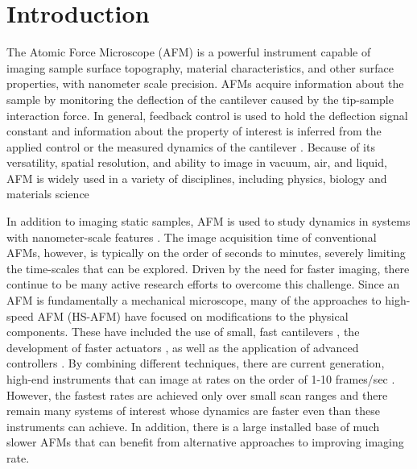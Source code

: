 \documentclass[twocolumn,oneside]{IEEEtran/IEEEtran}
\begin{document}
\section{Introduction}\label{sec:introduction}






The Atomic Force Microscope (AFM) is a powerful instrument capable of
imaging sample surface topography, material characteristics, and other
surface properties, with nanometer scale precision. AFMs acquire
information about the sample by monitoring the deflection of the
cantilever caused by the tip-sample interaction force. In general,
feedback control is used to hold the deflection signal constant and
information about the property of interest is inferred from the
applied control or the measured dynamics of the cantilever
\cite{Abramovitch:2007gt}. Because of its versatility, spatial
resolution, and ability to image in vacuum, air, and liquid, AFM is
widely used in a variety of disciplines, including physics, biology
and materials science
\cite{Dufrene:2017gm,Yang:2017im,Payton:2016hj,Altman:2015ic,Haase:2015eh}
	
In addition to imaging static samples, AFM is used to study dynamics
in systems with nanometer-scale features
\cite{Yang:2017im,Shibata:2017da,Shibata:2015jd,Ando:2014ja}. The
image acquisition time of conventional AFMs, however, is typically on
the order of seconds to minutes, severely limiting the time-scales
that can be explored. Driven by the need for faster imaging, there
continue to be many active research efforts to overcome this
challenge. Since an AFM is fundamentally a mechanical microscope, many
of the approaches to high-speed AFM (HS-AFM) have focused on
modifications to the physical components. These have included the use
of small, fast cantilevers \cite{viani1999fast,
  braunsmann2010high,Adams:2016hg}, the development of faster
actuators \cite{Maroufi:2015gt,Yong:2012kd,Kenton:2012cm}, as well as
the application of advanced controllers
\cite{Rana:2018es,Yong:2015gr,butterworth2010adaptive,salapaka2002high}.
By combining different techniques, there are current generation,
high-end instruments that can image at rates on the order of 1-10
frames/sec \cite{Ando:2014ja}. However, the fastest rates are achieved
only over small scan ranges and there remain many systems of interest
whose dynamics are faster even than these instruments can achieve. In
addition, there is a large installed base of much slower AFMs that can
benefit from alternative approaches to improving imaging rate.
	
\end{document}
